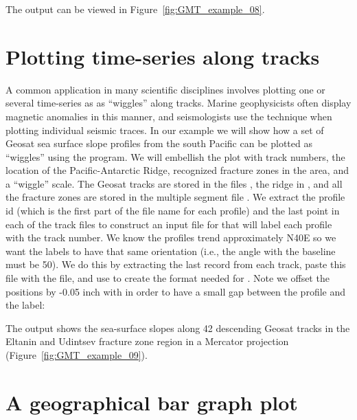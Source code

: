 The output can be viewed in Figure~\ref{fig:GMT_example_08}.


\section{Plotting time-series along tracks}

A common application in many scientific disciplines involves
plotting one or several time-series as as ``wiggles'' along
tracks.  Marine geophysicists often display magnetic anomalies
in this manner, and seismologists use the technique when
plotting individual seismic traces.  In our example we will
show how a set of Geosat sea surface slope profiles from the
south Pacific can be plotted as ``wiggles'' using the
 program. We will embellish the plot with track
numbers, the location of the Pacific-Antarctic Ridge, recognized
fracture zones in the area, and a ``wiggle'' scale.  The
Geosat tracks are stored in the files , the ridge in
, and all the fracture zones are stored in the multiple
segment file .  We extract the profile id (which is the
first part of the file name for each profile) and the last point
in each of the track files to construct an input file for
 that will label each profile with the track
number.  We know the profiles trend approximately N40\DS E
so we want the labels to have that same orientation (i.e., the
angle with the baseline must be 50\DS ).  We do this by
extracting the last record from each track, paste this file
with the  file, and use  to create the
format needed for .  Note we offset the positions
by -0.05 inch with  in order to have a small gap
between the profile and the label:


The output shows the sea-surface slopes along 42 descending
Geosat tracks in the Eltanin and Udintsev fracture zone
region in a Mercator projection (Figure~\ref{fig:GMT_example_09}).


\section{A geographical bar graph plot}

